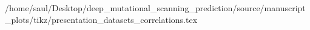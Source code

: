/home/saul/Desktop/deep_mutational_scanning_prediction/source/manuscript_plots/tikz/presentation_datasets_correlations.tex